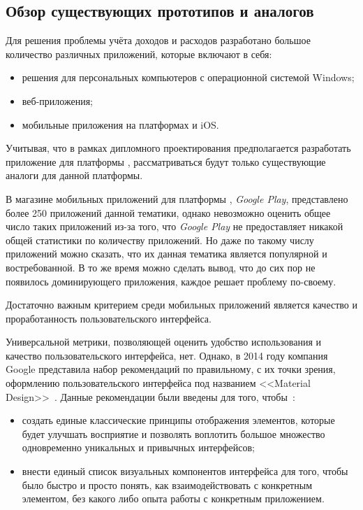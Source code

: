 \subsection{Обзор существующих прототипов и аналогов}
\label{sec:analysis:analogues}

Для решения проблемы учёта доходов и расходов разработано большое количество различных приложений, которые включают в себя:
\begin{itemize}
    \item решения для персональных компьютеров с операционной системой Windows;
    \item веб-приложения;
    \item мобильные приложения на платформах \andro и iOS\@.
\end{itemize}

Учитывая, что в рамках дипломного проектирования предполагается разработать приложение для платформы \andro, рассматриваться будут только существующие аналоги для данной платформы.

В магазине мобильных приложений для платформы \andro, \emph{Google Play}, представлено более 250 приложений данной тематики, однако невозможно оценить общее число таких приложений из-за того, что \emph{Google Play} не предоставляет никакой общей статистики по количеству приложений.
Но даже по такому числу приложений можно сказать, что их данная тематика является популярной и востребованной.
В то же время можно сделать вывод, что до сих пор не появилось доминирующего приложения, каждое решает проблему по-своему.

Достаточно важным критерием среди мобильных приложений является качество и проработанность пользовательского интерфейса.

Универсальной метрики, позволяющей оценить удобство использования и качество пользовательского интерфейса, нет.
Однако, в 2014 году компания Google представила набор рекомендаций по правильному, с их точки зрения, оформлению пользовательского интерфейса под названием <<Material Design>>~\cite{google_material_news}.
Данные рекомендации были введены для того, чтобы~\cite{google_material_guidelines}:
\begin{itemize}
    \item создать единые классические принципы отображения элементов, которые будет улучшать восприятие и позволять воплотить большое множество одновременно уникальных и привычных интерфейсов;
    \item внести единый список визуальных компонентов интерфейса для того, чтобы было быстро и просто понять, как взаимодействовать с конкретным элементом, без какого либо опыта работы с конкретным приложением.
\end{itemize}

